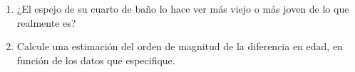 \item \begin{enumerate}
    \item ¿El espejo de su cuarto de baño lo hace ver más viejo o más joven de lo que realmente es?
    \item Calcule una estimación del orden de magnitud de la diferencia en edad, en función de los datos que especifique.
\end{enumerate}